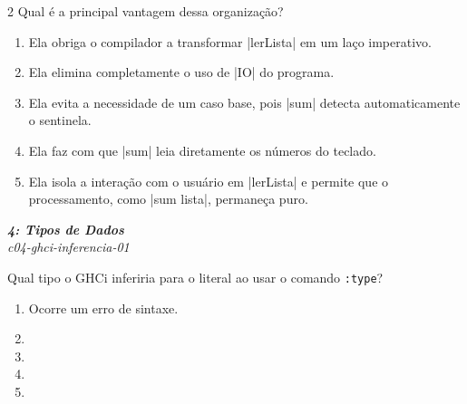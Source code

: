 \documentclass[a4paper,10pt,brazil]{article}
\begin{document}
\begin{multicols}{2}
Qual é a principal vantagem dessa organização?

\begin{enumerate}
  \item Ela obriga o compilador a transformar \haskellinline|lerLista| em um laço imperativo.

  \item Ela elimina completamente o uso de \haskellinline|IO| do programa.

  \item Ela evita a necessidade de um caso base, pois \haskellinline|sum| detecta automaticamente o sentinela.

  \item Ela faz com que \haskellinline|sum| leia diretamente os números do teclado.

  \item Ela isola a interação com o usuário em \haskellinline|lerLista| e permite que o processamento, como \haskellinline|sum lista|, permaneça puro.


\end{enumerate}

\begin{flushright}
  \footnotesize
  \textit{\textbf{4: Tipos de Dados}}\\
  \textit{c04-ghci-inferencia-01}\\

\end{flushright}
Qual tipo o GHCi inferiria para o literal  ao usar o comando \texttt{:type}?

\begin{enumerate}
  \item Ocorre um erro de sintaxe.

  \item {}

  \item {}

  \item {}

  \item {}


\end{enumerate}


\end{multicols}
\end{document}
